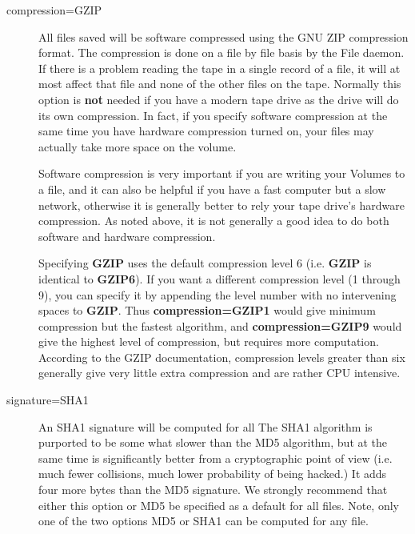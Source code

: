 \begin{description}

\item [compression=GZIP]
   All files saved will be software compressed using the GNU ZIP
   compression format.  The compression is done on a file by file basis by
   the File daemon.  If there is a problem reading the tape in a single
   record of a file, it will at most affect that file and none of the other
   files on the tape.  Normally this option is {\bf not} needed if you have
   a modern tape drive as the drive will do its own compression.  In fact,
   if you specify software compression at the same time you have hardware
   compression turned on, your files may actually take more space on the
   volume.

   Software compression is very important if you are writing your Volumes
   to a file, and it can also be helpful if you have a fast computer but a
   slow network, otherwise it is generally better to rely your tape drive's
   hardware compression.  As noted above, it is not generally a good idea
   to do both software and hardware compression.

   Specifying {\bf GZIP} uses the default compression level 6 (i.e.  {\bf
   GZIP} is identical to {\bf GZIP6}).  If you want a different compression
   level (1 through 9), you can specify it by appending the level number
   with no intervening spaces to {\bf GZIP}.  Thus {\bf compression=GZIP1}
   would give minimum compression but the fastest algorithm, and {\bf
   compression=GZIP9} would give the highest level of compression, but
   requires more computation.  According to the GZIP documentation,
   compression levels greater than six generally give very little extra
   compression and are rather CPU intensive.

\item [signature=SHA1]
   An SHA1 signature will be computed for all The SHA1 algorithm is
   purported to be some what slower than the MD5 algorithm, but at the same
   time is significantly better from a cryptographic point of view (i.e.
   much fewer collisions, much lower probability of being hacked.) It adds
   four more bytes than the MD5 signature.  We strongly recommend that
   either this option or MD5 be specified as a default for all files.
   Note, only one of the two options MD5 or SHA1 can be computed for any
   file.


\end{description}
